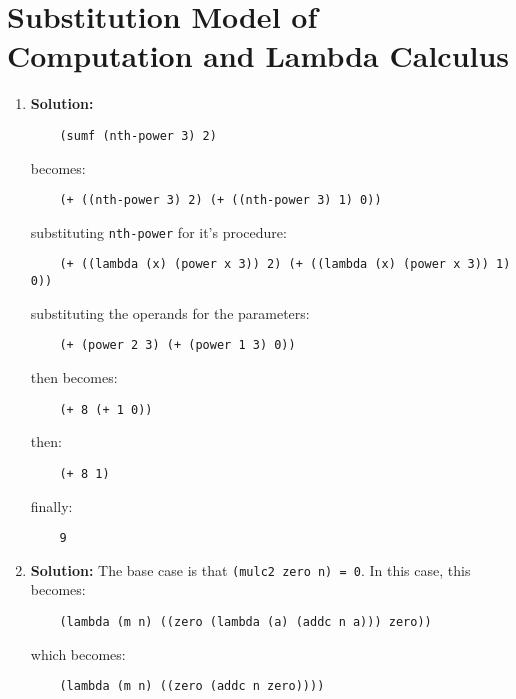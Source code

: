 \documentclass{article}
\begin{document}
\section{Substitution Model of Computation and Lambda Calculus}
\begin{enumerate}
    \item \textbf{Solution:}
    \begin{verbatim}
    (sumf (nth-power 3) 2)
    \end{verbatim}
    \vspace{-1em}
    becomes:
    \begin{verbatim}
    (+ ((nth-power 3) 2) (+ ((nth-power 3) 1) 0))
    \end{verbatim}
    \vspace{-1em}
    substituting \texttt{nth-power} for it's procedure:
    \begin{verbatim}
    (+ ((lambda (x) (power x 3)) 2) (+ ((lambda (x) (power x 3)) 1) 0))
    \end{verbatim}
    \vspace{-1em}
    substituting the operands for the parameters:
    \begin{verbatim}
    (+ (power 2 3) (+ (power 1 3) 0))
    \end{verbatim}
    \vspace{-1em}
    then becomes:
    \begin{verbatim}
    (+ 8 (+ 1 0))
    \end{verbatim}
    \vspace{-1em}
    then:
    \begin{verbatim}
    (+ 8 1)
    \end{verbatim}
    \vspace{-1em}
    finally:
    \begin{verbatim}
    9
    \end{verbatim}
    \vspace{-1em}
    \item \textbf{Solution:}
    The base case is that \texttt{(mulc2 zero n) = 0}. In this case, this becomes:
    \begin{verbatim}
    (lambda (m n) ((zero (lambda (a) (addc n a))) zero)) 
    \end{verbatim}
    \vspace{-1em}
    which becomes:
    \begin{verbatim}
    (lambda (m n) ((zero (addc n zero)))) 
    \end{verbatim}
    \vspace{-1em}

\end{enumerate}
\end{document}
